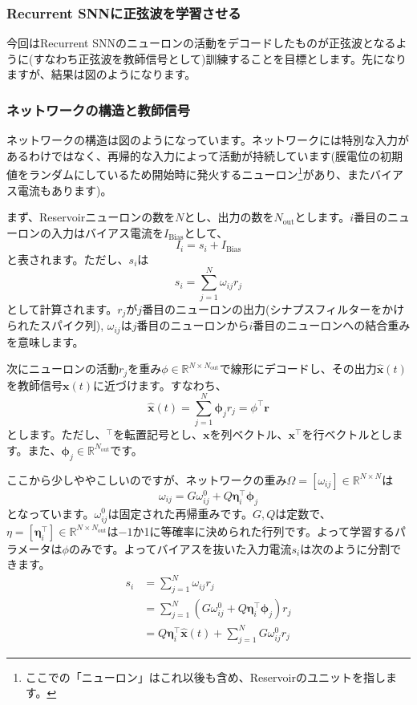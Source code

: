 \subsubsection{Recurrent SNNに正弦波を学習させる}
今回はRecurrent SNNのニューロンの活動をデコードしたものが正弦波となるように(すなわち正弦波を教師信号として)訓練することを目標とします。先になりますが、結果は図のようになります。
\subsubsection{ネットワークの構造と教師信号}
ネットワークの構造は図のようになっています。ネットワークには特別な入力があるわけではなく、再帰的な入力によって活動が持続しています(膜電位の初期値をランダムにしているため開始時に発火するニューロン\footnote{ここでの「ニューロン」はこれ以後も含め、Reservoirのユニットを指します。}があり、またバイアス電流もあります)。\par
まず、Reservoirニューロンの数を$N$とし、出力の数を$N_\text{out}$とします。$i$番目のニューロンの入力はバイアス電流を$I_{\text{Bias}}$として、
\begin{equation}
I_i=s_i+I_{\text{Bias}}    
\end{equation}
と表されます。ただし、$s_i$は 
\begin{equation}
s_{i}=\sum_{j=1}^{N} \omega_{i j} r_{j}    
\end{equation}
として計算されます。$r_j$が$j$番目のニューロンの出力(シナプスフィルターをかけられたスパイク列), $\omega_{i j}$は$j$番目のニューロンから$i$番目のニューロンへの結合重みを意味します。\par
次にニューロンの活動$r_j$を重み$\phi\in \mathbb{R}^{N\times N_\text{out}}$で線形にデコードし、その出力$\hat{\boldsymbol{x}}(t)$を教師信号$\boldsymbol{x}(t)$に近づけます。すなわち、
\begin{equation}
\hat{\boldsymbol{x}}(t)=\sum_{j=1}^{N} \boldsymbol{\phi}_j r_{j}=\phi^\intercal\boldsymbol{r}
\end{equation}
とします。ただし、$^\intercal$を転置記号とし、$\boldsymbol{x}$を列ベクトル、$\boldsymbol{x}^\intercal$を行ベクトルとします。また、$\boldsymbol{\phi}_j\in \mathbb{R}^{N_\text{out}}$です。\par
ここから少しややこしいのですが、ネットワークの重み$\Omega=[\omega_{ij}]\in \mathbb{R}^{N\times N}$は 
\begin{equation}
\omega_{i j}=G \omega_{i j}^{0}+Q \boldsymbol{\eta}_{i}^\intercal \boldsymbol{\phi}_j 
\end{equation}
となっています。$\omega_{i j}^{0}$は固定された再帰重みです。$G, Q$は定数で、$\eta=[\boldsymbol{\eta}_{i}^\intercal]\in \mathbb{R}^{N\times N_\text{out}}$は$-1$か1に等確率に決められた行列です。よって学習するパラメータは$\phi$のみです。よってバイアスを抜いた入力電流$s_{i}$は次のように分割できます。
\begin{align}
s_{i}&=\sum_{j=1}^{N} \omega_{i j} r_{j}\\
&=\sum_{j=1}^{N} \left(G \omega_{i j}^{0}+Q \boldsymbol{\eta}_{i}^\intercal \boldsymbol{\phi}_j \right)r_{j}\\
&=Q\boldsymbol{\eta}_{i}^\intercal \hat{\boldsymbol{x}}(t)+\sum_{j=1}^{N} G \omega_{i j}^{0}r_{j}
\end{align}

